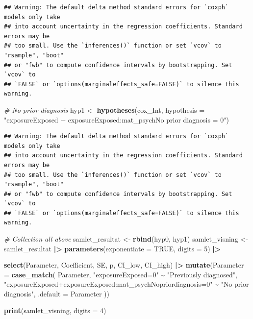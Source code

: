 \documentclass[
]{article}
\newenvironment{Shaded}{\begin{snugshade}}{\end{snugshade}}
\newcommand{\AttributeTok}[1]{\textcolor[rgb]{0.13,0.29,0.53}{#1}}
\newcommand{\CommentTok}[1]{\textcolor[rgb]{0.56,0.35,0.01}{\textit{#1}}}
\newcommand{\ConstantTok}[1]{\textcolor[rgb]{0.56,0.35,0.01}{#1}}
\newcommand{\DecValTok}[1]{\textcolor[rgb]{0.00,0.00,0.81}{#1}}
\newcommand{\FunctionTok}[1]{\textcolor[rgb]{0.13,0.29,0.53}{\textbf{#1}}}
\newcommand{\NormalTok}[1]{#1}
\newcommand{\OtherTok}[1]{\textcolor[rgb]{0.56,0.35,0.01}{#1}}
\newcommand{\SpecialCharTok}[1]{\textcolor[rgb]{0.81,0.36,0.00}{\textbf{#1}}}
\newcommand{\StringTok}[1]{\textcolor[rgb]{0.31,0.60,0.02}{#1}}
\begin{document}
\begin{verbatim}
## Warning: The default delta method standard errors for `coxph` models only take
## into account uncertainty in the regression coefficients. Standard errors may be
## too small. Use the `inferences()` function or set `vcov` to "rsample", "boot"
## or "fwb" to compute confidence intervals by bootstrapping. Set `vcov` to
## `FALSE` or `options(marginaleffects_safe=FALSE)` to silence this warning.
\end{verbatim}

\begin{Shaded}
\begin{Highlighting}[]
\CommentTok{\# No prior diagnosis}
\NormalTok{hyp1 }\OtherTok{\textless{}{-}} \FunctionTok{hypotheses}\NormalTok{(cox\_Int,}
                   \AttributeTok{hypothesis =}  \StringTok{"exposureExposed + \textasciigrave{}exposureExposed:mat\_psychNo prior diagnosis\textasciigrave{} = 0"}\NormalTok{)}
\end{Highlighting}
\end{Shaded}

\begin{verbatim}
## Warning: The default delta method standard errors for `coxph` models only take
## into account uncertainty in the regression coefficients. Standard errors may be
## too small. Use the `inferences()` function or set `vcov` to "rsample", "boot"
## or "fwb" to compute confidence intervals by bootstrapping. Set `vcov` to
## `FALSE` or `options(marginaleffects_safe=FALSE)` to silence this warning.
\end{verbatim}

\begin{Shaded}
\begin{Highlighting}[]
\CommentTok{\# Collection all above}
\NormalTok{samlet\_resultat }\OtherTok{\textless{}{-}} \FunctionTok{rbind}\NormalTok{(hyp0, hyp1)}
\NormalTok{samlet\_visning }\OtherTok{\textless{}{-}}\NormalTok{ samlet\_resultat }\SpecialCharTok{|\textgreater{}} 
  \FunctionTok{parameters}\NormalTok{(}\AttributeTok{exponentiate =} \ConstantTok{TRUE}\NormalTok{, }\AttributeTok{digits =} \DecValTok{5}\NormalTok{) }\SpecialCharTok{|\textgreater{}} 
  
  \FunctionTok{select}\NormalTok{(Parameter, Coefficient, SE, p, CI\_low, CI\_high) }\SpecialCharTok{|\textgreater{}} 
  \FunctionTok{mutate}\NormalTok{(}\AttributeTok{Parameter =} \FunctionTok{case\_match}\NormalTok{(}
\NormalTok{    Parameter,}
    \StringTok{"exposureExposed=0"} \SpecialCharTok{\textasciitilde{}} \StringTok{"Previously diagnosed"}\NormalTok{,}
    \StringTok{"exposureExposed+\textasciigrave{}exposureExposed:mat\_psychNopriordiagnosis\textasciigrave{}=0"} \SpecialCharTok{\textasciitilde{}} \StringTok{"No prior diagnosis"}\NormalTok{,}
    \AttributeTok{.default =}\NormalTok{ Parameter}
\NormalTok{  ))}

\FunctionTok{print}\NormalTok{(samlet\_visning, }\AttributeTok{digits =} \DecValTok{4}\NormalTok{)}
\end{Highlighting}
\end{Shaded}
\end{document}
